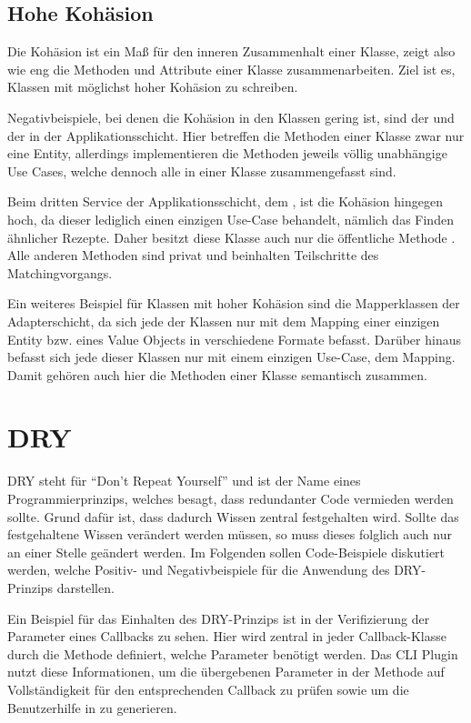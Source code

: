 \subsection{Hohe Kohäsion}
Die Kohäsion ist ein Maß für den inneren Zusammenhalt einer Klasse, zeigt also wie eng die Methoden und Attribute einer Klasse zusammenarbeiten. Ziel ist es, Klassen mit möglichst hoher Kohäsion zu schreiben.

Negativbeispiele, bei denen die Kohäsion in den Klassen gering ist, sind der  und der  in der Applikationsschicht. Hier betreffen die Methoden einer Klasse zwar nur eine Entity, allerdings implementieren die Methoden jeweils völlig unabhängige Use Cases, welche dennoch alle in einer Klasse zusammengefasst sind.

Beim dritten Service der Applikationsschicht, dem , ist die Kohäsion hingegen hoch, da dieser lediglich einen einzigen Use-Case behandelt, nämlich das Finden ähnlicher Rezepte. Daher besitzt diese Klasse auch nur die öffentliche Methode . Alle anderen Methoden sind privat und beinhalten Teilschritte des Matchingvorgangs.

Ein weiteres Beispiel für Klassen mit hoher Kohäsion sind die Mapperklassen der Adapterschicht, da sich jede der Klassen nur mit dem Mapping einer einzigen Entity bzw. eines Value Objects in verschiedene Formate befasst. Darüber hinaus befasst sich jede dieser Klassen nur mit einem einzigen Use-Case, dem Mapping. Damit gehören auch hier die Methoden einer Klasse semantisch zusammen.

\section{DRY}
DRY steht für \enquote{Don't Repeat Yourself} und ist der Name eines Programmierprinzips, welches besagt, dass redundanter Code vermieden werden sollte. Grund dafür ist, dass dadurch Wissen zentral festgehalten wird. Sollte das festgehaltene Wissen verändert werden müssen, so muss dieses folglich auch nur an einer Stelle geändert werden. Im Folgenden sollen Code-Beispiele diskutiert werden, welche Positiv- und Negativbeispiele für die Anwendung des DRY-Prinzips darstellen.

Ein Beispiel für das Einhalten des DRY-Prinzips ist in der Verifizierung der Parameter eines Callbacks zu sehen. Hier wird zentral in jeder Callback-Klasse durch die Methode  definiert, welche Parameter benötigt werden. Das CLI Plugin nutzt diese Informationen, um die übergebenen Parameter in der Methode  auf Vollständigkeit für den entsprechenden Callback zu prüfen sowie um die Benutzerhilfe in  zu generieren.

